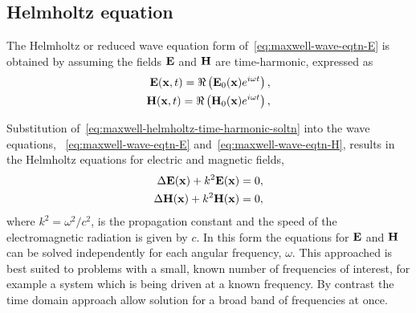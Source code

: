 \subsection{Helmholtz equation}
The Helmholtz or reduced wave equation form of~\eqref{eq:maxwell-wave-eqtn-E} is obtained by assuming the fields $\mathbf{E}$ and $\mathbf{H}$ are time-harmonic, expressed as
\begin{align}
  \label{eq:maxwell-helmholtz-time-harmonic-soltn}
  \mathbf{E}(\mathbf{x},t) = \Re \left( \mathbf{E}_0(\mathbf{x}) e^{i \omega t} \right), \\
  \mathbf{H}(\mathbf{x},t) = \Re \left( \mathbf{H}_0(\mathbf{x}) e^{i \omega t} \right),
\end{align}

Substitution of~\eqref{eq:maxwell-helmholtz-time-harmonic-soltn} into the wave equations, ~\eqref{eq:maxwell-wave-eqtn-E} and~\eqref{eq:maxwell-wave-eqtn-H}, results in the Helmholtz equations for electric and magnetic fields,
\begin{align}
  \label{eq:helmholtz}
  \Delta \mathbf{E}(\mathbf{x}) + k^2 \mathbf{E}(\mathbf{x}) = 0, \\
  \Delta \mathbf{H}(\mathbf{x}) + k^2 \mathbf{H}(\mathbf{x}) = 0,
\end{align}
where $k^2 =\omega^2/c^2$, is the propagation constant and the speed of the electromagnetic radiation is given by $c$. In this form the equations for $\mathbf{E}$ and $\mathbf{H}$ can be solved independently for each angular frequency, $\omega$. This approached is best suited to problems with a small, known number of frequencies of interest, for example a system which is being driven at a known frequency. By contrast the time domain approach allow solution for a broad band of frequencies at once.




